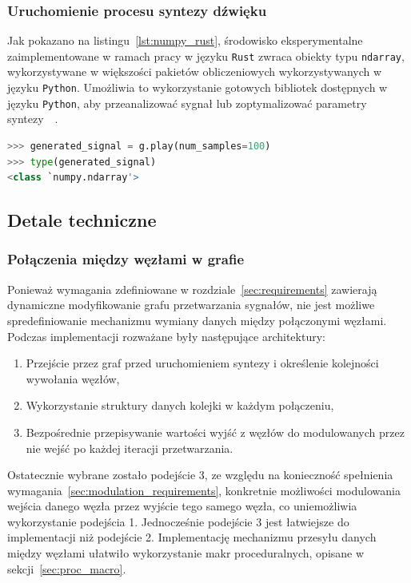 \subsubsection{Uruchomienie procesu syntezy dźwięku}

Jak pokazano na listingu~\ref{lst:numpy_rust}, środowisko eksperymentalne zaimplementowane w ramach pracy w języku \texttt{Rust}
zwraca obiekty typu \texttt{ndarray}, wykorzystywane w większości pakietów obliczeniowych wykorzystywanych w języku \texttt{Python}.
Umożliwia to wykorzystanie gotowych bibliotek dostępnych w języku \texttt{Python},
aby przeanalizować sygnał lub zoptymalizować parametry syntezy~\cite{2020SciPy-NMeth}~\cite{librosa}.

\begin{lstlisting}[language=python, caption=Typ danych zwracanych przez środowisko eksperymentalne., label={lst:numpy_rust}]
>>> generated_signal = g.play(num_samples=100)
>>> type(generated_signal)
<class `numpy.ndarray'>
\end{lstlisting}

\subsection{Detale techniczne}

\subsubsection{Połączenia między węzłami w grafie}

Ponieważ wymagania zdefiniowane w rozdziale~\ref{sec:requirements} zawierają dynamiczne modyfikowanie grafu przetwarzania sygnałów,
nie jest możliwe spredefiniowanie mechanizmu wymiany danych między połączonymi węzłami.
Podczas implementacji rozważane były następujące architektury:

\begin{enumerate}
  \item Przejście przez graf przed uruchomieniem syntezy i określenie kolejności wywołania węzłów,
  \item Wykorzystanie struktury danych kolejki w każdym połączeniu,
  \item Bezpośrednie przepisywanie wartości wyjść z węzłów do modulowanych przez nie wejść po każdej iteracji przetwarzania.\label{test}
\end{enumerate}

Ostatecznie wybrane zostało podejście 3, ze względu na konieczność spełnienia wymagania~\ref{sec:modulation_requirements},
konkretnie możliwości modulowania wejścia danego węzła
przez wyjście tego samego węzła, co uniemożliwia wykorzystanie podejścia 1. Jednocześnie
podejście 3 jest łatwiejsze do implementacji niż podejście 2. Implementację mechanizmu
przesyłu danych między węzłami ułatwiło wykorzystanie makr proceduralnych, opisane w sekcji~\ref{sec:proc_macro}.

